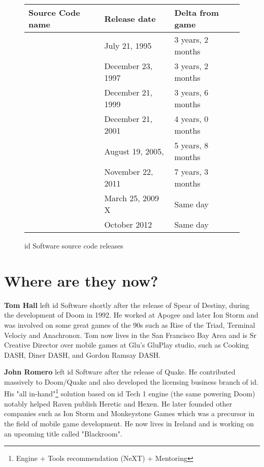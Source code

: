  \begin{figure}[H]
\centering  
\begin{tabularx}{\textwidth}{ X  Y  Y}
  \toprule
  \textbf{Source Code name} &  \textbf{Release date} & \textbf{Delta from game}\\ 
  \toprule {} & July 21, 1995 & 3 years, 2 months\\ 
            & December 23, 1997 & 3 years, 2 months\\ 
            & December 21, 1999 & 3 years, 6 months\\ 
            & December 21, 2001 & 4 years, 0 months \\ 
            & August 19, 2005, & 5 years, 8 months\\ 
            & November 22, 2011 & 7 years, 3 months\\ 
            &  March 25, 2009 X & Same day \\ 
            & October 2012 & Same day \\  
  \toprule
\end{tabularx}
\caption{id Software source code releases}\label{fig:vga_history}
\end{figure}


\section{Where are they now?}

\textbf{Tom Hall} left id Software shortly after the release of Spear of Destiny, during the development of Doom in 1992. He worked at Apogee and later Ion Storm and was involved on some great games of the 90s such as Rise of the Triad, Terminal Velociy and Anachronox. Tom now lives in the San Francisco Bay Area and is Sr Creative Director over mobile games at Glu's GluPlay studio, such as Cooking DASH, Diner DASH, and Gordon Ramsay DASH.\\
\par

\textbf{John Romero} left id Software after the release of Quake. He contributed massively to Doom/Quake and also developed the licensing business branch of id. His "all in-hand"\footnote{Engine + Tools recommendation (NeXT) + Mentoring} solution based on id Tech 1 engine (the same powering Doom) notably helped Raven publish Heretic and Hexen. He later founded other companies such as Ion Storm and Monkeystone Games which was a precursor in the field of mobile game development. He now lives in Ireland and is working on an upcoming title called "Blackroom".\\
\par

